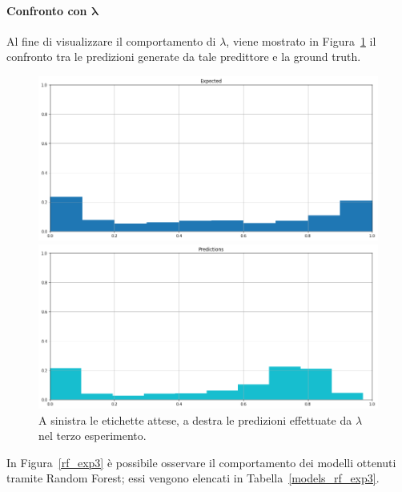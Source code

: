 \documentclass[12pt]{report}
\theoremstyle{definition}
\begin{document}
\paragraph{Confronto con $\bm{\lambda}$}
Al fine di visualizzare il comportamento di $\lambda$, viene mostrato in Figura~\ref{prediction_exp3} il confronto tra le predizioni generate da tale predittore e la ground truth.
\begin{figure}
\centering
    \begin{minipage}{0.48\textwidth}
        \includegraphics[width=\linewidth]{images/experiment_beta05_disgiunti/expected_memberships.png}
    \end{minipage}
    \begin{minipage}{0.48\textwidth}
        \includegraphics[width=\linewidth]{images/experiment_beta05_disgiunti/prediction_memberships.png}
    \end{minipage}
    \caption{A sinistra le etichette attese, a destra le predizioni effettuate da $\lambda$ nel terzo esperimento.}
    \label{prediction_exp3}
\end{figure} 

In Figura~\ref{rf_exp3} è possibile osservare il comportamento dei modelli ottenuti tramite Random Forest; essi vengono elencati in Tabella~\ref{models_rf_exp3}.
\end{document}
